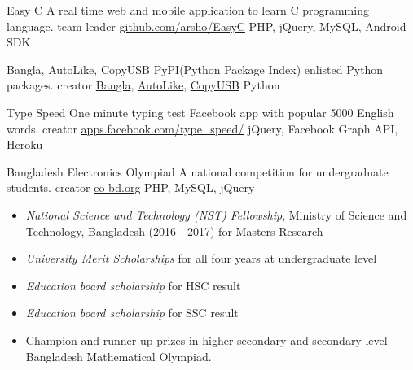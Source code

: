 \documentclass[10pt,a4paper]{altacv}
\begin{document}
\cvproject
{Easy C}
{A real time web and mobile application to learn C programming language.}
{team leader}
{\href{https://github.com/arsho/EasyC/}{github.com/arsho/EasyC}}
{PHP, jQuery, MySQL, Android SDK}
\divider

\cvproject
{Bangla, AutoLike, CopyUSB}
{PyPI(Python Package Index) enlisted Python packages.}
{creator}
{\href{https://pypi.python.org/pypi/bangla/}{Bangla}, \href{https://pypi.python.org/pypi/autolike/}{AutoLike}, \href{https://pypi.python.org/pypi/copyusb/}{CopyUSB}}
{Python}
\divider

\cvproject
{Type Speed}
{One minute typing test Facebook app with popular 5000 English words.}
{creator}
{\href{https://apps.facebook.com/type_speed/}{apps.facebook.com/type\_speed/}}
{jQuery, Facebook Graph API, Heroku}
\divider

\cvproject 
{Bangladesh Electronics Olympiad}
{A national competition for undergraduate students.}
{creator}
{\href{http://www.eo-bd.org/}{eo-bd.org}}
{PHP, MySQL, jQuery}




\clearpage

\begin{itemize}

\item \emph{National Science and Technology (NST) Fellowship}, Ministry of Science and Technology, Bangladesh (2016 - 2017) for Masters Research

\divider

\item \emph{University Merit Scholarships} for all four years at undergraduate level

\divider

\item \emph{Education board scholarship} for HSC result

\divider

\item \emph{Education board scholarship} for SSC result

\divider

\item Champion and runner up prizes in higher secondary and secondary level Bangladesh Mathematical Olympiad.

\end{itemize}
\end{document}
